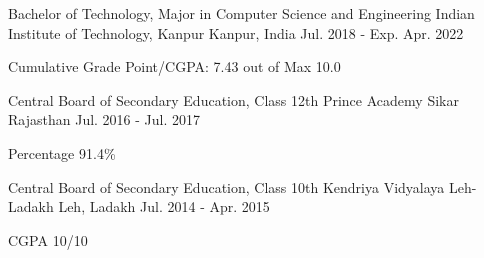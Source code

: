 

\begin{cventries}

  \cventry
    {Bachelor of Technology, Major in Computer Science and Engineering} %
    {Indian Institute of Technology, Kanpur} %
    {Kanpur, India} %
    {Jul. 2018 - Exp. Apr. 2022} %
    {
      \begin{cvitems} %
        \item {Cumulative Grade Point/CGPA: 7.43 out of Max 10.0}
      \end{cvitems}
    }
    
 \cventry
    {Central Board of Secondary Education, Class 12th} %
    {Prince Academy} %
    {Sikar Rajasthan} %
    {Jul. 2016 - Jul. 2017} %
    {
      \begin{cvitems} %
        \item {Percentage 91.4\%}
      \end{cvitems}
    }
    
  \cventry
    {Central Board of Secondary Education, Class 10th} %
    {Kendriya Vidyalaya Leh-Ladakh} %
    {Leh, Ladakh} %
    {Jul. 2014 - Apr. 2015} %
    {
      \begin{cvitems} %
        \item {CGPA 10/10}
      \end{cvitems}
    }

\end{cventries}
